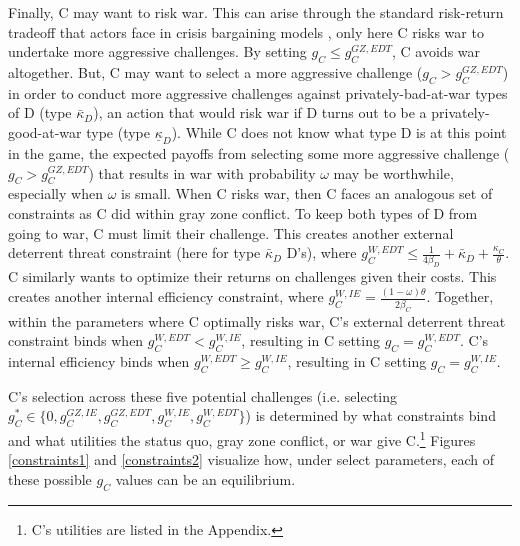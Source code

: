\documentclass[11pt,letterpaper,pdftex,dvipsnames,table]{article}
\begin{document}
Finally, C may want to risk war. This can arise through the standard risk-return tradeoff that actors face in crisis bargaining models \citep{fearon_rationalistexplanationswar_1995, ramsay_informationuncertaintywar_2017}, only here C risks war to undertake more aggressive challenges. By setting $g_{C}\leq g_{C}^{GZ,EDT}$, C avoids war altogether. But, C may want to select a more aggressive challenge ($g_{C}>g_{C}^{GZ,EDT}$) in order to conduct more aggressive challenges against privately-bad-at-war types of D (type $\bar{\kappa}_{D}$), an action that would risk war if D turns out to be a privately-good-at-war type (type $\underline{\kappa}_{D}$). While C does not know what type D is at this point in the game, the expected payoffs from selecting some more aggressive challenge ($g_{C}>g_{C}^{GZ,EDT}$) that results in war with probability $\omega$ may be worthwhile, especially when $\omega$ is small. When C risks war, then C faces an analogous set of constraints as C did within gray zone conflict. To keep both types of D from going to war, C must limit their challenge. This creates another external deterrent threat constraint (here for type $\bar{\kappa}_{D}$ D's), where $g_{C}^{W,EDT}\leq \frac{1}{4\beta_{D}}+\bar{\kappa}_{D}+\frac{\kappa_{C}}{\theta}$. C similarly wants to optimize their returns on challenges given their costs. This creates another internal efficiency constraint, where $g_{C}^{W,IE}=\frac{(1-\omega)\theta}{2\beta_{C}}$. Together, within the parameters where C optimally risks war, C's external deterrent threat constraint binds when $g_{C}^{W,EDT}<g_{C}^{W,IE}$, resulting in C setting $g_{C}=g_{C}^{W,EDT}$. C's internal efficiency binds when $g_{C}^{W,EDT}\geq g_{C}^{W,IE}$, resulting in C setting $g_{C}=g_{C}^{W,IE}$.

C's selection across these five potential challenges (i.e. selecting $g_{C}^{*}\in\{0,g_{C}^{GZ,IE},g_{C}^{GZ,EDT},g_{C}^{W,IE},g_{C}^{W,EDT}\}$) is determined by what constraints bind and what utilities the status quo, gray zone conflict, or war give C.\footnote{C's utilities are listed in the Appendix.} Figures \ref{constraints1} and \ref{constraints2} visualize how, under select parameters, each of these possible $g_C$ values can be an equilibrium. 
\end{document}
